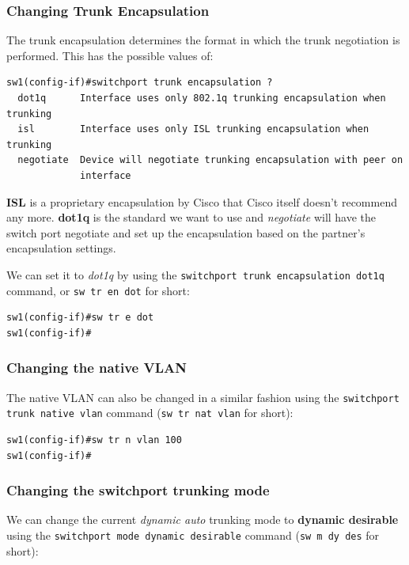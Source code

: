 \subsubsection{Changing Trunk Encapsulation}
The trunk encapsulation determines the format in which the trunk negotiation is performed. This has the possible values of: 

\vspace{-15pt}
\begin{verbatim}
sw1(config-if)#switchport trunk encapsulation ?
  dot1q      Interface uses only 802.1q trunking encapsulation when trunking
  isl        Interface uses only ISL trunking encapsulation when trunking
  negotiate  Device will negotiate trunking encapsulation with peer on
             interface
\end{verbatim}
\vspace{-10pt}

\noindent
\textbf{ISL} is a proprietary encapsulation by Cisco that Cisco itself doesn't recommend any more. \textbf{dot1q} is the standard we want to use and \textit{negotiate} will have the switch port negotiate and set up the encapsulation based on the partner's encapsulation settings. 

We can set it to \textit{dot1q} by using the \verb|switchport trunk encapsulation dot1q| command, or \verb|sw tr en dot| for short:

\vspace{-15pt}
\begin{verbatim}
sw1(config-if)#sw tr e dot
sw1(config-if)#
\end{verbatim}
\vspace{-10pt}

\subsubsection{Changing the native VLAN}
The native VLAN can also be changed in a similar fashion using the \verb|switchport trunk native vlan| command (\verb|sw tr nat vlan| for short):

\vspace{-15pt}
\begin{verbatim}
sw1(config-if)#sw tr n vlan 100
sw1(config-if)#
\end{verbatim}
\vspace{-10pt}

\subsubsection{Changing the switchport trunking mode}
We can change the current \textit{dynamic auto} trunking mode to \textbf{dynamic desirable} using the \verb|switchport mode dynamic desirable| command (\verb|sw m dy des| for short):

